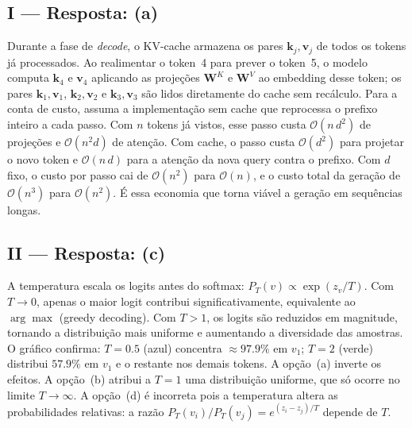 \documentclass{dlproblemset}
\begin{document}
\subsection*{I — Resposta: (a)}
Durante a fase de \emph{decode}, o KV-cache armazena os pares $\mathbf{k}_j, \mathbf{v}_j$ de todos
os tokens já processados. Ao realimentar o token~4 para prever o token~5, o modelo
computa $\mathbf{k}_4$ e $\mathbf{v}_4$ aplicando as projeções $\mathbf{W}^K$ e $\mathbf{W}^V$ ao embedding desse
token; os pares $\mathbf{k}_1,\mathbf{v}_1$, $\mathbf{k}_2,\mathbf{v}_2$ e $\mathbf{k}_3,\mathbf{v}_3$ são lidos diretamente do
cache sem recálculo.
Para a conta de custo, assuma a implementação sem cache que reprocessa o prefixo
inteiro a cada passo. Com $n$ tokens já vistos, esse passo custa $\mathcal{O}(n\,d^2)$
de projeções e $\mathcal{O}(n^2 d)$ de atenção. Com cache, o passo custa
$\mathcal{O}(d^2)$ para projetar o novo token e $\mathcal{O}(n\,d)$ para a atenção da
nova query contra o prefixo. Com $d$ fixo, o custo por passo cai de $\mathcal{O}(n^2)$
para $\mathcal{O}(n)$, e o custo total da geração de $\mathcal{O}(n^3)$ para
$\mathcal{O}(n^2)$. É essa economia que torna viável a geração em sequências longas.

\subsection*{II — Resposta: (c)}
A temperatura escala os logits antes do softmax: $P_T(v) \propto \exp(z_v/T)$.
Com $T \to 0$, apenas o maior logit contribui significativamente, equivalente ao
$\arg\max$ (greedy decoding). Com $T > 1$, os logits são reduzidos em magnitude,
tornando a distribuição mais uniforme e aumentando a diversidade das amostras.
O gráfico confirma: $T{=}0.5$ (azul) concentra ${\approx}97.9\%$ em $v_1$;
$T{=}2$ (verde) distribui $57.9\%$ em $v_1$ e o restante nos demais tokens.
A opção~(a) inverte os efeitos. A opção~(b) atribui a $T{=}1$ uma distribuição
uniforme, que só ocorre no limite $T \to \infty$. A opção~(d) é incorreta pois a temperatura altera as probabilidades
relativas: a razão $P_T(v_i)/P_T(v_j) = e^{(z_i-z_j)/T}$ depende de $T$.

\end{document}
